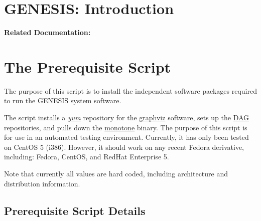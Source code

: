 \documentclass[12pt]{article}
\begin{document}
\section*{GENESIS: Introduction}

{\bf Related Documentation:}

\section*{The Prerequisite Script}

The purpose of this script is to install the independent software packages required to run the GENESIS system software.

The script installs a \href{http://www.centos.org/docs/5/html/yum/}{\it yum} repository for the \href{http://www.graphviz.org/}{graphviz} software, sets up the \href{http://dag.wieers.com/rpm/}{DAG} repositories, and pulls down the \href{http://monotone.ca/}{monotone} binary. The purpose of this script is for use in an automated testing environment. Currently, it has only been tested on CentOS 5 (i386). However, it should work on any recent Fedora derivative, including: Fedora, CentOS, and RedHat Enterprise 5.

Note that currently all values are hard coded, including architecture and distribution information.

\subsection*{Prerequisite Script Details}
\end{document}
